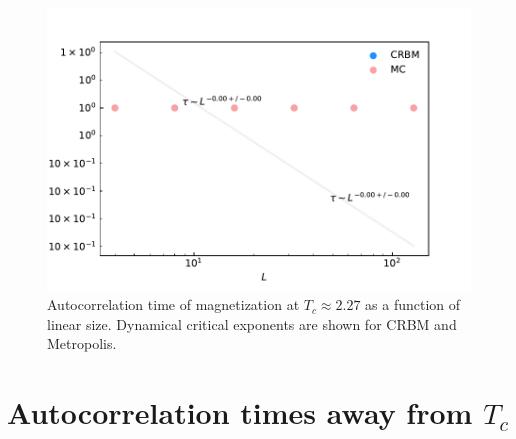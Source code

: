 \documentclass[12pt]{article}
\begin{document}
\begin{figure}[t!]
\begin{center}
    \includegraphics[width=1.0\columnwidth]{../figures/L_many_T_2.27_J1_-1.0_J2_0.0_seed_1968_kernelDims_2-2_analytical_autocorr_M.pdf}
\end{center}
\caption{Autocorrelation time of magnetization at $T_c\approx2.27$ as a function of linear size. Dynamical critical exponents are shown for CRBM and Metropolis.}
\label{fig:tau_M_Tc}
\end{figure}


\section*{Autocorrelation times away from $T_c$}
\end{document}
